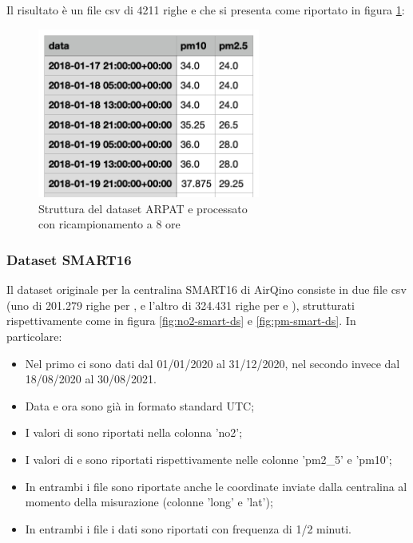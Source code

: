 Il risultato è un file csv di 4211 righe e che si presenta come riportato in figura \ref{fig:ds-arpat-pm-dopo}:

\begin{figure}[H]
\centering
\captionsetup{justification=centering}
\includegraphics[width=0.65\textwidth,height=\textheight,keepaspectratio]{img/dataset_arpat_pm_dopo.png}
\caption{Struttura del dataset ARPAT  e  processato\\con ricampionamento a 8 ore}
\label{fig:ds-arpat-pm-dopo}
\end{figure}


\subsubsection{Dataset SMART16}
Il dataset originale per la centralina SMART16 di AirQino consiste in due file csv (uno di 201.279 righe per , e l'altro di 324.431 righe per  e ), strutturati rispettivamente come in figura \ref{fig:no2-smart-ds} e \ref{fig:pm-smart-ds}. In particolare:

\begin{itemize}
  \item Nel primo ci sono dati dal 01/01/2020 al 31/12/2020, nel secondo invece dal 18/08/2020 al 30/08/2021.
  \item Data e ora sono già in formato standard UTC;
  \item I valori di  sono riportati nella colonna 'no2';
  \item I valori di  e  sono riportati rispettivamente nelle colonne 'pm2\_5' e 'pm10';
  \item In entrambi i file sono riportate anche le coordinate inviate dalla centralina al momento della misurazione (colonne 'long' e 'lat');
  \item In entrambi i file i dati sono riportati con frequenza di 1/2 minuti.
\end{itemize}

